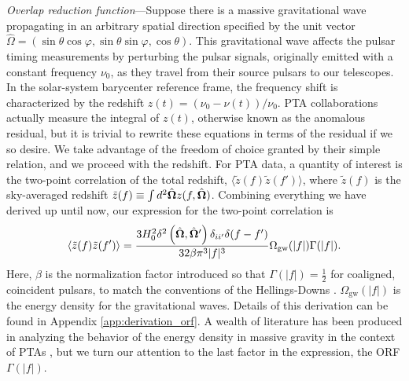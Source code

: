 \documentclass[prd,twocolumn,aps,psfig,nofootinbib,nobibnotes,superscriptaddress,preprintnumbers,times]{revtex4-2}
\begin{document}
\textit{Overlap reduction function}---Suppose there is a massive gravitational wave propagating in an arbitrary spatial direction specified by the unit vector $\hat{\Omega} = (                     \sin\theta \cos\varphi,
                        \sin\theta \sin\varphi,
                        \cos\theta)$.
This gravitational wave affects the pulsar timing measurements by perturbing the pulsar signals, originally emitted with a constant frequency $\nu_0$, as they travel from their source pulsars to our telescopes. In the solar-system barycenter reference frame, the frequency shift is characterized by the redshift
$z(t) = (\nu_0 - \nu(t))/\nu_0$.
PTA collaborations actually measure the integral of $z(t)$, otherwise known as the anomalous residual, but it is trivial to rewrite these equations in terms of the residual if we so desire. We take advantage of the freedom of choice granted by their simple relation, and we proceed with the redshift. For PTA data, a quantity of interest is the two-point correlation of the total redshift, $\langle \tilde{z}(f) \tilde{z}(f') \rangle$, where $\tilde{z}(f)$ is the sky-averaged redshift $\tilde{z}(f) \equiv \int d^2\hat{\bf \Omega} z(f, \hat{\bf \Omega})$. Combining everything we have derived up until now, our expression for the two-point correlation is
\begin{equation}\label{eqn:two_point_z}
    \langle \tilde{z}(f) \tilde{z}(f') \rangle = \frac{3H_0^2\delta^2\left(\hat{\bf \Omega} , \hat{\bf \Omega}'\right)\delta_{ii'}\delta(f - f')}{32 \beta \pi^3|f|^3}\Omega_{\text{gw}}(|f|) \Gamma(|f|).
\end{equation}
Here, $\beta$ is the normalization factor introduced so that $\Gamma(|f|) = \frac{1}{2}$ for coaligned, coincident pulsars, to match the conventions of the Hellings-Downs \cite{Romano:2023zhb}. $\Omega_{\text{gw}}(|f|)$ is the energy density for the gravitational waves. Details of this derivation can be found in Appendix \ref{app:derivation_orf}. A wealth of literature has been produced in analyzing the behavior of the energy density in massive gravity in the context of PTAs \cite{Choi:2023tun, Wu:2023rib, Kenjale:2024rsc, He:2021bqm}, but we turn our attention to the last factor in the expression, the ORF $\Gamma(|f|)$. 
\end{document}
